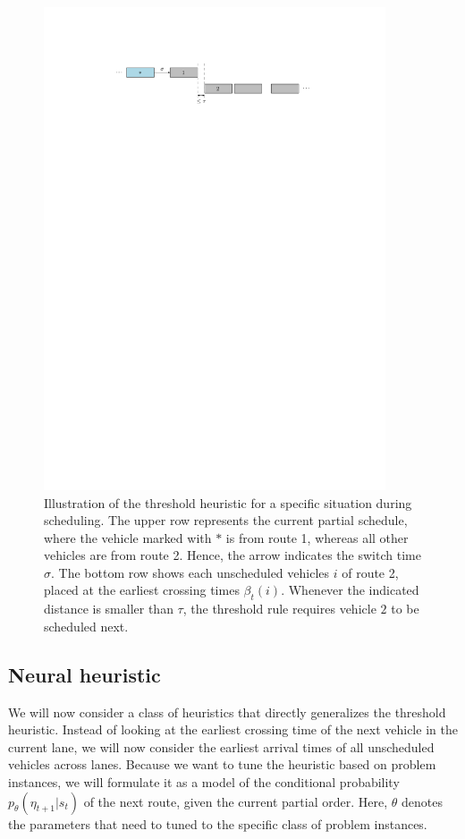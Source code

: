 \documentclass[a4paper]{article}
\theoremstyle{definition}
\theoremstyle{plain}
\begin{document}
\begin{figure}
  \centering
  \includegraphics[width=0.9\textwidth]{figures/single/threshold}
  \caption{Illustration of the threshold heuristic for a specific situation
    during scheduling. The upper row represents the current partial schedule,
    where the vehicle marked with $*$ is from route 1, whereas all other
    vehicles are from route 2. Hence, the arrow indicates the switch time $\sigma$.
    The bottom row shows each unscheduled vehicles $i$ of route 2, placed at the
    earliest crossing times $\beta_{t}(i)$. Whenever the indicated distance is
    smaller than $\tau$, the threshold rule requires vehicle $2$ to be scheduled
    next.}\label{fig:threshold_heuristic}
\end{figure}


\subsection{Neural heuristic}
\label{sec:neural}

We will now consider a class of heuristics that directly generalizes the
threshold heuristic. Instead of looking at the earliest crossing time of the
next vehicle in the current lane, we will now consider the earliest arrival
times of all unscheduled vehicles across lanes.
%
Because we want to tune the heuristic based on problem instances, we will
formulate it as a model of the conditional probability
$p_{\theta}(\eta_{t+1} | s_{t})$ of the next route, given the current partial
order. Here, $\theta$ denotes the parameters that need to tuned to the specific class
of problem instances.
\end{document}
